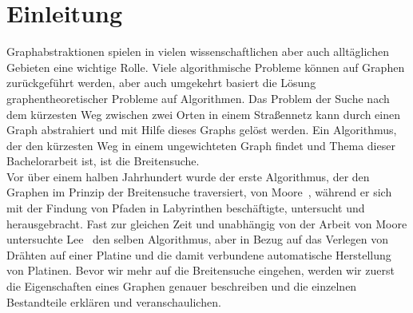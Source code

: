 \documentclass[11pt,a4paper]{article}
\begin{document}
\section{Einleitung}
\label{sec:einleitung}
Graphabstraktionen spielen in vielen wissenschaftlichen aber auch alltäglichen Gebieten eine wichtige Rolle. Viele algorithmische Probleme können auf Graphen zurückgeführt werden, aber auch umgekehrt basiert die Lösung graphentheoretischer Probleme auf Algorithmen. Das Problem der Suche nach dem kürzesten Weg zwischen zwei Orten in einem Straßennetz kann durch einen Graph abstrahiert und mit Hilfe dieses Graphs gelöst werden. Ein Algorithmus, der den kürzesten Weg in einem ungewichteten Graph findet und Thema dieser Bachelorarbeit ist, ist die Breitensuche.\\
Vor über einem halben Jahrhundert wurde der erste Algorithmus, der den Graphen im Prinzip der Breitensuche traversiert, von Moore~\cite{moore}, während er sich mit der Findung von Pfaden in Labyrinthen beschäftigte, untersucht und herausgebracht. Fast zur gleichen Zeit und unabhängig von der Arbeit von Moore untersuchte Lee~\cite{lee} den selben Algorithmus, aber in Bezug auf das Verlegen von Drähten auf einer Platine und die damit verbundene automatische Herstellung von Platinen. Bevor wir mehr auf die Breitensuche eingehen, werden wir zuerst die Eigenschaften eines Graphen genauer beschreiben und die einzelnen Bestandteile erklären und veranschaulichen.
\end{document}
